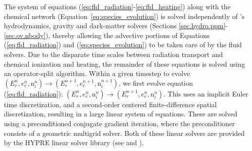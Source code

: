 
The system of equations
(\ref{eq:fld_radiation}-\ref{eq:fld_heating}) along with the chemical network 
(Equation~\ref{eq:species_evolution}) is solved
independently of \enzo's hydrodynamics, gravity and dark-matter solvers
(Sections \ref{sec.hydro.ppm}-\ref{sec.ov.nbody}), thereby allowing
the advective portions of Equations (\ref{eq:fld_radiation}) and
(\ref{eq:species_evolution}) to be taken care of by the fluid solvers.
Due to the disparate time scales between radiation transport and chemical
ionization and heating, the remainder of these equations is solved
using an operator-split algorithm.  Within a given timestep to evolve
$(E_r^n, e_c^n, {\mathrm n}_i^n) \to (E_r^{n+1}, e_c^{n+1}, {\mathrm
n}_i^{n+1})$, we first evolve equation (\ref{eq:fld_radiation}):
$(E_r^n, e_c^n, {\mathrm n}_i^n) \to (E_r^{n+1}, e_c^{n}, {\mathrm
  n}_i^{n})$.  This uses an implicit Euler time discretization, and a
second-order centered finite-difference spatial discretization,
resulting in a large linear system of equations.  These are solved
using a preconditioned conjugate gradient iteration, where the
preconditioner consists of a geometric multigrid solver.  Both of
these linear solvers are provided by the HYPRE linear solver library
(see \cite{FalgoutYang2002} and \cite{hypre-manual}). 


